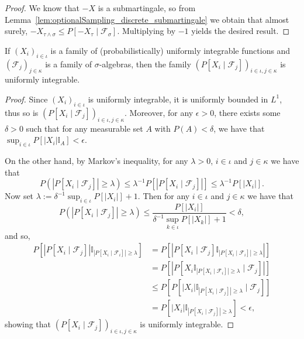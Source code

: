 \begin{proof}
We know that $-X$ is a submartingale, so from Lemma~\ref{lem:optionalSampling_discrete_submartingale} we obtain that almost surely, $-X_{\tau \wedge \sigma} \le P[-X_{\tau} \mid \mathcal{F}_{\sigma}]$. Multiplying by $-1$ yields the desired result.
\end{proof}


\begin{lemma}\label{lem:condExpUI}
  \leanok
  If $(X_i)_{i \in \iota}$ is a family of (probabilistically) uniformly integrable functions and $(\mathcal{F}_j)_{j \in \kappa}$ is a family of $\sigma$-algebras,
  then the family $(P[X_i \mid \mathcal{F}_j])_{i \in \iota, j \in \kappa}$ is uniformly integrable.
\end{lemma}

\begin{proof}\leanok
  Since $(X_i)_{i \in \iota}$ is uniformly integrable, it is uniformly bounded in $L^1$, thus so is $(P[X_i \mid \mathcal{F}_j])_{i \in \iota, j \in \kappa}$. Moreover, for any \(\epsilon > 0\),
  there exists some \(\delta > 0\) such that
  for any measurable set \(A\) with \(P(A) < \delta\), we have that \(\sup_{i \in \iota} P[|X_i| \mathbb{I}_A] < \epsilon\).

  On the other hand, by Markov's inequality, for any $\lambda > 0$, $i \in \iota$ and $j \in \kappa$ we have that
  \[P(|P[X_i \mid \mathcal{F}_j]| \ge \lambda) \le \lambda^{-1}P[|P[X_i \mid \mathcal{F}_j]|] \le \lambda^{-1}P[|X_i|].\]
  Now set \(\lambda := \delta^{-1} \sup_{i \in \iota} P[|X_i|] + 1\). Then for any $i \in \iota$ and $j \in \kappa$ we have that
  \[P(|P[X_i \mid \mathcal{F}_j]| \ge \lambda) \le \frac{P[|X_i|]}{\delta^{-1} \sup_{k \in \iota} P[|X_k|] + 1} < \delta,\]
  and so,
  \begin{align*}
    P[|P[X_i \mid \mathcal{F}_j]| \mathbb{I}_{|P[X_i \mid \mathcal{F}_i]| \ge \lambda}]
    & = P[|P[X_i \mid \mathcal{F}_j] \mathbb{I}_{|P[X_i \mid \mathcal{F}_i]| \ge \lambda}|] \\
    & = P[|P[X_i \mathbb{I}_{|P[X_i \mid \mathcal{F}_i]| \ge \lambda} \mid \mathcal{F}_j]|] \\
    & \le P[P[|X_i|\mathbb{I}_{|P[X_i \mid \mathcal{F}_j]| \ge \lambda} \mid \mathcal{F}_j]] \\
    & = P[|X_i|\mathbb{I}_{|P[X_i \mid \mathcal{F}_j]| \ge \lambda}] < \epsilon,
  \end{align*}
  showing that \((P[X_i \mid \mathcal{F}_j])_{i \in \iota, j \in \kappa}\) is uniformly integrable.
\end{proof}


